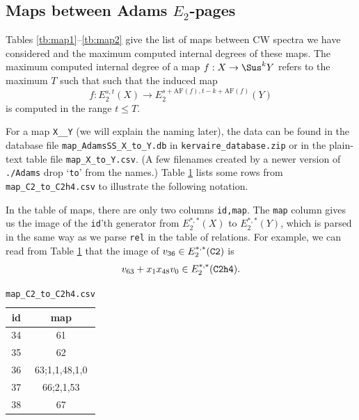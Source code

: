 \documentclass{amsart}
\numberwithin{equation}{section}
\newcommand{\AF}{\mathrm{AF}}
\begin{document}
\subsection{Maps between Adams $E_2$-pages}
Tables \ref{tb:map1}--\ref{tb:map2} give the list of maps between CW spectra we have considered and the maximum computed internal degrees of these maps. The maximum computed internal degree of a map $f: X\to \Sus^{k}Y$ refers to the maximum $T$ such that such that the induced map $$f:E_2^{s,t}(X)\to E_2^{s+\AF(f),t-k+\AF(f)}(Y)$$ is computed in the range $t\le T$.\vspace{2pt}



For a map \texttt{X\_\_Y} (we will explain the naming later), the data can be found in the database file \texttt{map\_AdamsSS\_X\_to\_Y.db} in \texttt{kervaire\_database.zip} or in the plain-text table file \texttt{map\_X\_to\_Y.csv}. (A few filenames created by a newer version of \verb|./Adams| drop `\verb|to|' from the names.) Table \ref{tb:mapcsv} lists some rows from \verb|map_C2_to_C2h4.csv| to illustrate the following notation.

\begin{notation}
    In the table of maps, there are only two columns \verb|id,map|. The \verb|map| column gives us the image of the \verb|id|'th generator from $E_2^{*,*}(X)$ to $E_2^{*,*}(Y)$, which is parsed in the same way as we parse \verb|rel| in the table of relations. For example, we can read from Table \ref{tb:mapcsv} that the image of $v_{36}\in E_2^{*,*}(\verb|C2|)$ is
    $$v_{63}+x_1x_{48}v_0\in E_2^{*,*}(\verb|C2h4|).$$
\end{notation}

\begin{table}
\begin{tabular}{|c|c|}\hline
id & map \\\hline
34 & 61 \\\hline
35 & 62 \\\hline
36 & 63;1,1,48,1,0 \\\hline
37 & 66;2,1,53 \\\hline
38 & 67 \\\hline
\end{tabular}
\caption{\texttt{map\_C2\_to\_C2h4.csv}}\label{tb:mapcsv}
\end{table}
\end{document}
